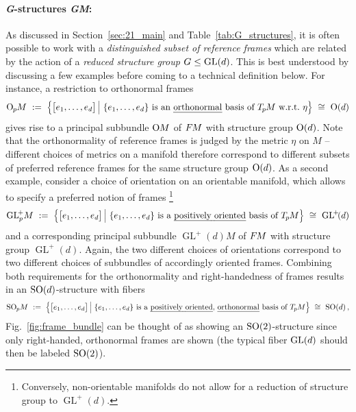 \paragraph{\textit{G}\hspace{.5pt}-\hspace{.5pt}structures \textit{GM}:}
As discussed in Section~\ref{sec:21_main} and Table~\ref{tab:G_structures}, it is often possible to work with a \emph{distinguished subset of reference frames} which are related by the action of a \emph{reduced structure group} $G \leq \operatorname{GL}(d)$.
This is best understood by discussing a few examples before coming to a technical definition below.
For instance, a restriction to orthonormal frames 
\begin{align}
    \OpM\ :=\ \pig\{ \big[e_{1},\dots,e_{d}\big]\, \pig|\ 
    \{e_{1},\dots,e_{d}\}\ \text{is an \emph{orthonormal} basis of } \TpM\ \text{w.r.t.}\ \eta \pig\}\ \cong\ \O{d}
\end{align}
gives rise to a principal subbundle $\operatorname{O}\mkern-3.6muM$ of $F\mkern-1.5muM$ with structure group $\operatorname{O}(d)$.
Note that the orthonormality of reference frames is judged by the metric $\eta$ on $M$ -- different choices of metrics on a manifold therefore correspond to different subsets of preferred reference frames for the same structure group $\operatorname{O}(d)$.
As a second example, consider a choice of orientation on an orientable manifold, which allows to specify a preferred notion of frames%
\footnote{
    Conversely, non-orientable manifolds do not allow for a reduction of structure group to $\operatorname{GL}^{\!+}\!(d)$.
}
\begin{align}
    \operatorname{GL}^{\!+}_p\!M\ :=\ \pig\{ \big[e_{1},\dots,e_{d}\big]\, \pig|\ \{e_{1},\dots,e_{d}\}\ \text{is a \emph{positively oriented} basis of } \TpM \pig\}\ \cong\ \operatorname{GL}^{\!+}\!(d)
\end{align}
and a corresponding principal subbundle $\operatorname{GL}^{\!+}\!(d)M$ of $F\mkern-1.5muM$ with structure group $\operatorname{GL}^{\!+}\!(d)$.
Again, the two different choices of orientations correspond to two different choices of subbundles of accordingly oriented frames.
Combining both requirements for the orthonormality and right-handedness of frames results in an $\operatorname{SO}(d)$-structure with fibers
\begin{align}
    \SOpM\ :=\ \pig\{ \big[e_{1},\dots,e_{d}\big]\, \pig|\ 
    \{e_{1},\dots,e_{d}\}\ \text{is a \emph{positively oriented}, \emph{orthonormal} basis of } \TpM \pig\}\ \cong\ \SO{d} \,,
\end{align}
Fig.~\ref{fig:frame_bundle} can be thought of as showing an $\operatorname{SO}(2)$-structure since only right-handed, orthonormal frames are shown (the typical fiber $\operatorname{GL}(d)$ should then be labeled $\operatorname{SO}(2)$).
